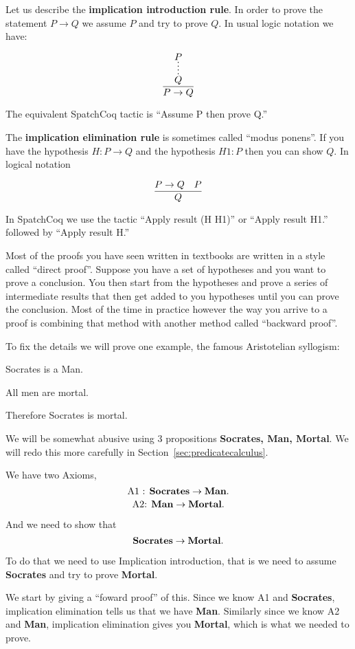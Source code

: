 \begin{itemize}
Let us describe the {\bf implication introduction rule}.  In order to prove the statement $P\rightarrow Q$ we  assume $P$ and try to prove $Q$. In usual logic notation we have:

$$\infer{P\rightarrow Q}{%
    \infer*{Q}{P}
}$$

The equivalent SpatchCoq tactic is ``Assume P then prove Q.''


The {\bf implication elimination rule} is sometimes called ``modus ponens''. If you have the hypothesis $H:P\rightarrow Q$ and the hypothesis $H1:P$ then you can show $Q$. In logical notation

$$\infer{Q}{P\rightarrow Q & P}$$

In SpatchCoq we use the tactic ``Apply result (H H1)'' or ``Apply result H1.'' followed by ``Apply result H.''



Most of the proofs you have seen written in textbooks are written in a style called ``direct proof''. Suppose you have a set of hypotheses and you want to prove a conclusion. You then start from the hypotheses and prove a series of intermediate results that then get added to you hypotheses until you can prove the conclusion. Most of the time in practice however the way you arrive to a proof is  combining that method with another method called ``backward proof''. 

To fix the details we will prove one example, the famous Aristotelian syllogism:

Socrates is a Man.

All men are mortal.

Therefore Socrates is mortal.

We will be somewhat abusive using 3 propositions {\bf Socrates, Man, Mortal}. We will redo this more carefully in Section~\ref{sec:predicatecalculus}.

We have two Axioms, 
$$\mbox{A1 :  \bf Socrates} \rightarrow \mbox{\bf Man}.$$
$$\mbox{A2: \bf  Man} \rightarrow \mbox{\bf Mortal}.$$

And we need to show that $$\mbox{\bf Socrates} \rightarrow \mbox{\bf Mortal}.$$



To do that we need to use Implication introduction, that is we need to assume {\bf Socrates} and try to prove {\bf Mortal}. 

 We start by giving a ``foward proof'' of this. Since we know  A1 and {\bf Socrates}, implication elimination tells us that we have {\bf Man}. Similarly since we know A2 and {\bf Man}, implication elimination gives you {\bf Mortal}, which is what we needed to prove.


\end{itemize}
